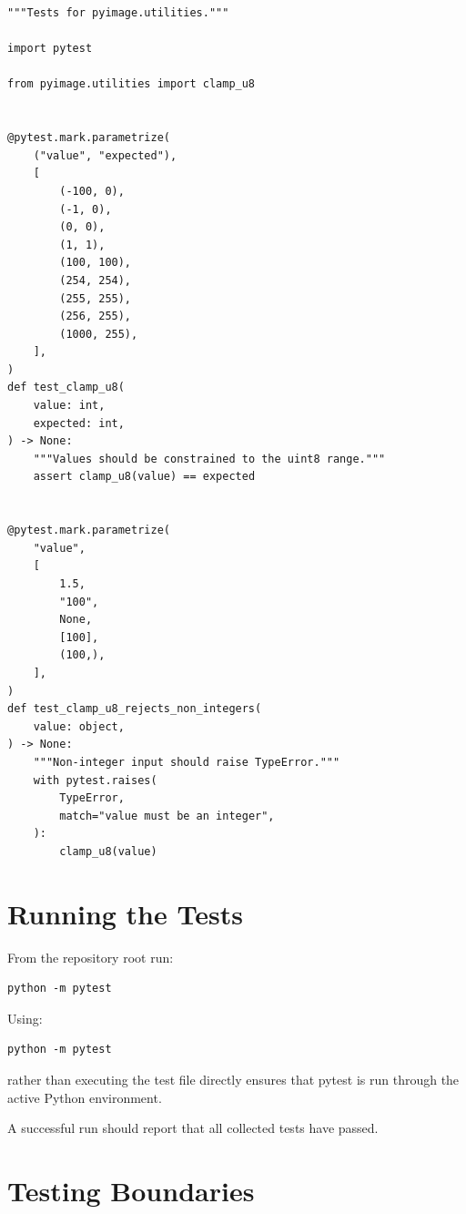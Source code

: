 \begin{listing}[htbp]
    \caption{Automated tests for \texttt{clamp\_u8()}.}
    \label{lst:test-utilities}

\begin{verbatim}
"""Tests for pyimage.utilities."""

import pytest

from pyimage.utilities import clamp_u8


@pytest.mark.parametrize(
    ("value", "expected"),
    [
        (-100, 0),
        (-1, 0),
        (0, 0),
        (1, 1),
        (100, 100),
        (254, 254),
        (255, 255),
        (256, 255),
        (1000, 255),
    ],
)
def test_clamp_u8(
    value: int,
    expected: int,
) -> None:
    """Values should be constrained to the uint8 range."""
    assert clamp_u8(value) == expected


@pytest.mark.parametrize(
    "value",
    [
        1.5,
        "100",
        None,
        [100],
        (100,),
    ],
)
def test_clamp_u8_rejects_non_integers(
    value: object,
) -> None:
    """Non-integer input should raise TypeError."""
    with pytest.raises(
        TypeError,
        match="value must be an integer",
    ):
        clamp_u8(value)
\end{verbatim}

\end{listing}


\section{Running the Tests}
\label{sec:running-first-tests}

From the repository root run:

\begin{verbatim}
python -m pytest
\end{verbatim}

Using:

\begin{verbatim}
python -m pytest
\end{verbatim}

rather than executing the test file directly ensures that pytest is
run through the active Python environment.

A successful run should report that all collected tests have passed.


\section{Testing Boundaries}
\label{sec:test-boundaries}

